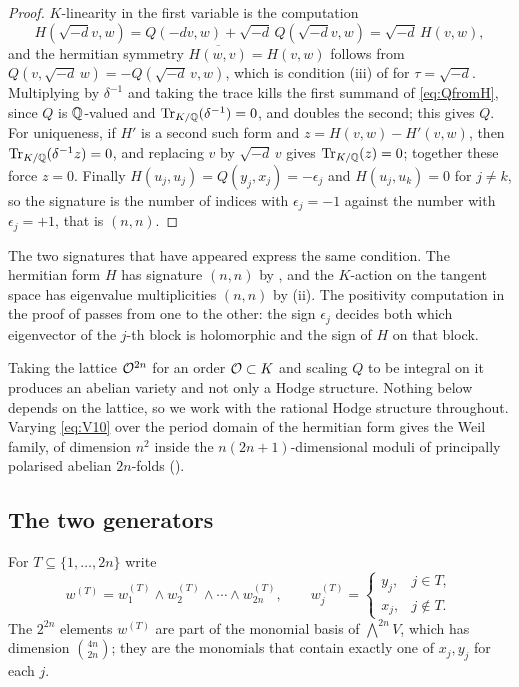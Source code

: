 \begin{proof}
$K$-linearity in the first variable is the computation
\[
  H(\sqrt{-d}v,w)=Q(-dv,w)+\sqrt{-d}\,Q(\sqrt{-d}v,w)=\sqrt{-d}\,H(v,w),
\]
and the hermitian symmetry $\overline{H(w,v)}=H(v,w)$ follows from
$Q(v,\sqrt{-d}\,w)=-Q(\sqrt{-d}\,v,w)$, which is condition (iii) of
 for $\tau=\sqrt{-d}$. Multiplying by $\delta^{-1}$ and
taking the trace kills the first summand of \eqref{eq:QfromH}, since $Q$ is
$\mathbb{Q}$-valued and $\operatorname{Tr}_{K/\mathbb{Q}}(\delta^{-1})=0$, and doubles the second; this
gives $Q$. For uniqueness, if $H'$ is a second such form and
$z=H(v,w)-H'(v,w)$, then $\operatorname{Tr}_{K/\mathbb{Q}}(\delta^{-1}z)=0$, and replacing $v$ by
$\sqrt{-d}\,v$ gives $\operatorname{Tr}_{K/\mathbb{Q}}(z)=0$; together these force $z=0$. Finally
$H(u_{j},u_{j})=Q(y_{j},x_{j})=-\epsilon_{j}$ and
$H(u_{j},u_{k})=0$ for $j\ne k$, so the signature is the number of indices with
$\epsilon_{j}=-1$ against the number with $\epsilon_{j}=+1$, that is $(n,n)$.
\end{proof}

\begin{remark}\label{rem:twosignatures}
The two signatures that have appeared express the same condition. The hermitian
form $H$ has signature $(n,n)$ by , and the $K$-action on
the tangent space has eigenvalue multiplicities $(n,n)$ by
(ii). The positivity computation in the proof of
 passes from one to the other: the sign $\epsilon_{j}$
decides both which eigenvector of the $j$-th block is holomorphic and the sign
of $H$ on that block.
\end{remark}

\begin{remark}\label{rem:lattice}
Taking the lattice $\mathcal{O}^{2n}$ for an order $\mathcal{O}\subset K$ and scaling $Q$ to be
integral on it produces an abelian variety and not only a Hodge structure.
Nothing below depends on the lattice, so we work with the rational Hodge
structure throughout. Varying \eqref{eq:V10} over the period domain of the
hermitian form gives the Weil family, of dimension $n^{2}$ inside the
$n(2n+1)$-dimensional moduli of principally polarised abelian $2n$-folds
().
\end{remark}

\subsection{The two generators}

\begin{notation}\label{not:wT}
For $T\subseteq\{1,\dots,2n\}$ write
\[
  w^{(T)}=w^{(T)}_{1}\wedge w^{(T)}_{2}\wedge\cdots\wedge w^{(T)}_{2n},
  \qquad
  w^{(T)}_{j}=
  \begin{cases}
    y_{j}, & j\in T,\\
    x_{j}, & j\notin T .
  \end{cases}
\]
The $2^{2n}$ elements $w^{(T)}$ are part of the monomial basis of
$\bigwedge^{2n}V$, which has dimension $\binom{4n}{2n}$; they are the
monomials that contain exactly one of $x_{j},y_{j}$ for each $j$.
\end{notation}

